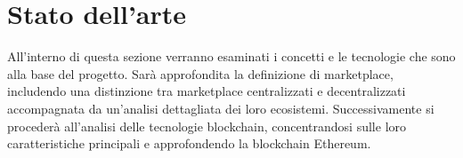 \chapter{Stato dell'arte}
\label{sec:state_of_the_art}

All'interno di questa sezione verranno esaminati i concetti e le tecnologie che sono alla base del progetto.
Sarà approfondita la definizione di marketplace, includendo una distinzione tra marketplace centralizzati e decentralizzati accompagnata da un'analisi dettagliata dei loro ecosistemi. Successivamente si procederà all'analisi delle tecnologie blockchain, concentrandosi sulle loro caratteristiche principali e approfondendo la blockchain Ethereum.




